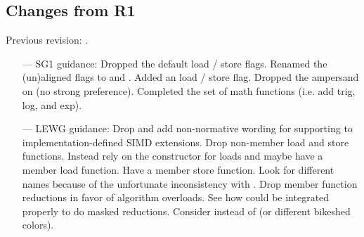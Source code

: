 \subsection{Changes from R1}
Previous revision: \citep{P0214R1}.
\begin{itemize}
    \chck Fixed converting constructor synopsis of \datapar and \mask to also allow varying Abi types.
    \chck Modified the wording of  to make the existence of the functions implementation-defined.
    \chck Updated the discussion of member types to reflect the changes in R1.
    \chck Added all previous SG1 straw poll results.
    \chck Fixed  to not invent native Abi that makes the operator ill-formed.
    \chck Dropped table of math functions.
    \chck Be more explicit about the implementation-defined Abi types.
    \chck Discuss resolution of the \fixedsizeN design (\ref{sec:fixedsize progress}).
  \color{black}\item[---] SG1 guidance:
    \chck Dropped the default load / store flags.
    \chck Renamed the (un)aligned flags to  and .
    \chck Added an  load / store flag.
    \chck Dropped the ampersand on  (no strong preference).
    \chck Completed the set of math functions (i.e. add trig, log, and exp).
  \color{black}\item[---] LEWG guidance:
    \todo Drop  and add non-normative wording for supporting  to implementation-defined SIMD extensions.
    \todo Drop non-member load and store functions.
    Instead rely on the constructor for loads and maybe have a member load function.
    Have a member store function.
    Look for different names because of the unfortunate inconsistency with \std{}.
    \todo Drop member function reductions in favor of algorithm overloads.
    See how  could be integrated properly to do masked reductions.
    \todo Consider  instead of  (or different bikeshed colors).
\end{itemize}






